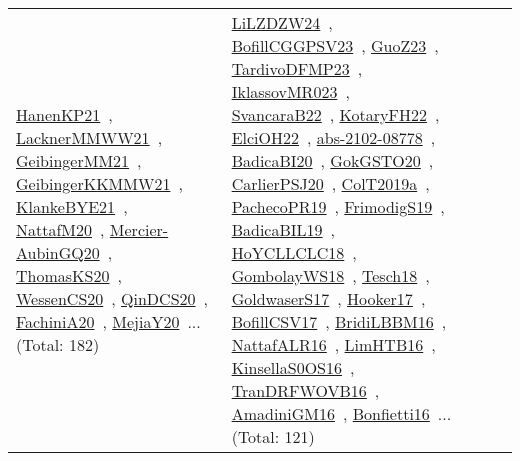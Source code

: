 {\begin{longtable}{lp{3cm}>{\raggedright\arraybackslash}p{6cm}>{\raggedright\arraybackslash}p{6cm}>{\raggedright\arraybackslash}p{8cm}}
\href{../works/HanenKP21.pdf}{HanenKP21}~\cite{HanenKP21}, \href{../works/LacknerMMWW21.pdf}{LacknerMMWW21}~\cite{LacknerMMWW21}, \href{../works/GeibingerMM21.pdf}{GeibingerMM21}~\cite{GeibingerMM21}, \href{../works/GeibingerKKMMW21.pdf}{GeibingerKKMMW21}~\cite{GeibingerKKMMW21}, \href{../works/KlankeBYE21.pdf}{KlankeBYE21}~\cite{KlankeBYE21}, \href{../works/NattafM20.pdf}{NattafM20}~\cite{NattafM20}, \href{../works/Mercier-AubinGQ20.pdf}{Mercier-AubinGQ20}~\cite{Mercier-AubinGQ20}, \href{../works/ThomasKS20.pdf}{ThomasKS20}~\cite{ThomasKS20}, \href{../works/WessenCS20.pdf}{WessenCS20}~\cite{WessenCS20}, \href{../works/QinDCS20.pdf}{QinDCS20}~\cite{QinDCS20}, \href{../works/FachiniA20.pdf}{FachiniA20}~\cite{FachiniA20}, \href{../works/MejiaY20.pdf}{MejiaY20}~\cite{MejiaY20}... (Total: 182) & \href{../works/LiLZDZW24.pdf}{LiLZDZW24}~\cite{LiLZDZW24}, \href{../works/BofillCGGPSV23.pdf}{BofillCGGPSV23}~\cite{BofillCGGPSV23}, \href{../works/GuoZ23.pdf}{GuoZ23}~\cite{GuoZ23}, \href{../works/TardivoDFMP23.pdf}{TardivoDFMP23}~\cite{TardivoDFMP23}, \href{../works/IklassovMR023.pdf}{IklassovMR023}~\cite{IklassovMR023}, \href{../works/SvancaraB22.pdf}{SvancaraB22}~\cite{SvancaraB22}, \href{../works/KotaryFH22.pdf}{KotaryFH22}~\cite{KotaryFH22}, \href{../works/ElciOH22.pdf}{ElciOH22}~\cite{ElciOH22}, \href{../works/abs-2102-08778.pdf}{abs-2102-08778}~\cite{abs-2102-08778}, \href{../works/BadicaBI20.pdf}{BadicaBI20}~\cite{BadicaBI20}, \href{../works/GokGSTO20.pdf}{GokGSTO20}~\cite{GokGSTO20}, \href{../works/CarlierPSJ20.pdf}{CarlierPSJ20}~\cite{CarlierPSJ20}, \href{../works/ColT2019a.pdf}{ColT2019a}~\cite{ColT2019a}, \href{../works/PachecoPR19.pdf}{PachecoPR19}~\cite{PachecoPR19}, \href{../works/FrimodigS19.pdf}{FrimodigS19}~\cite{FrimodigS19}, \href{../works/BadicaBIL19.pdf}{BadicaBIL19}~\cite{BadicaBIL19}, \href{../works/HoYCLLCLC18.pdf}{HoYCLLCLC18}~\cite{HoYCLLCLC18}, \href{../works/GombolayWS18.pdf}{GombolayWS18}~\cite{GombolayWS18}, \href{../works/Tesch18.pdf}{Tesch18}~\cite{Tesch18}, \href{../works/GoldwaserS17.pdf}{GoldwaserS17}~\cite{GoldwaserS17}, \href{../works/Hooker17.pdf}{Hooker17}~\cite{Hooker17}, \href{../works/BofillCSV17.pdf}{BofillCSV17}~\cite{BofillCSV17}, \href{../works/BridiLBBM16.pdf}{BridiLBBM16}~\cite{BridiLBBM16}, \href{../works/NattafALR16.pdf}{NattafALR16}~\cite{NattafALR16}, \href{../works/LimHTB16.pdf}{LimHTB16}~\cite{LimHTB16}, \href{../works/KinsellaS0OS16.pdf}{KinsellaS0OS16}~\cite{KinsellaS0OS16}, \href{../works/TranDRFWOVB16.pdf}{TranDRFWOVB16}~\cite{TranDRFWOVB16}, \href{../works/AmadiniGM16.pdf}{AmadiniGM16}~\cite{AmadiniGM16}, \href{../works/Bonfietti16.pdf}{Bonfietti16}~\cite{Bonfietti16}... (Total: 121)\\

\end{longtable}}
